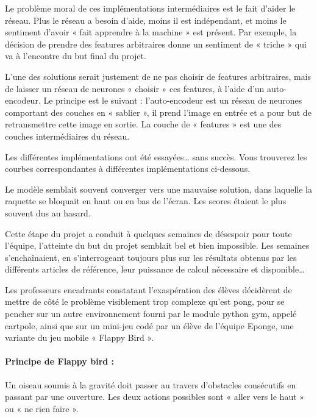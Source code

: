 \documentclass[
    10pt,
    a4paper,
    oneside,
    headinclude,footinclude,
    BCOR=5mm,
    captions=tableabove
]{scrartcl}
\begin{document}
Le problème moral de ces implémentations intermédiaires est le fait d’aider le réseau. Plus le réseau a besoin d’aide, moins il est indépendant, et moins le sentiment d’avoir « fait apprendre à la machine » est présent. Par exemple, la décision de prendre des features arbitraires donne un sentiment de « triche » qui va à l’encontre du but final du projet. 

L’une des solutions serait justement de ne pas choisir de features arbitraires, mais de laisser un réseau de neurones « choisir » ces features, à l’aide d’un auto-encodeur. Le principe est le suivant : l’auto-encodeur est un réseau de neurones comportant des couches en « sablier », il prend l’image en entrée et a pour but de retransmettre cette image en sortie. La couche de « features » est une des couches intermédiaires du réseau. %

Les différentes implémentations ont été essayées… sans succès. Vous trouverez les courbes correspondantes à différentes implémentations ci-dessous.

Le modèle semblait souvent converger vers une mauvaise solution, dans laquelle la raquette se bloquait en haut ou en bas de l'écran. Les scores étaient le plus souvent dus au hasard.


Cette étape du projet a conduit à quelques semaines de désespoir pour toute l’équipe, l’atteinte du but du projet semblait bel et bien impossible. Les semaines s’enchaînaient, en s’interrogeant toujours plus sur les résultats obtenus par les différents articles de référence, leur puissance de calcul nécessaire et disponible…

Les professeurs encadrants constatant l’exaspération des élèves décidèrent de mettre de côté le problème visiblement trop complexe qu’est pong, pour se pencher sur un autre environnement fourni par le module python gym, appelé cartpole, ainsi que sur un mini-jeu codé par un élève de l’équipe Eponge, une variante du jeu mobile « Flappy Bird ».

\paragraph{Principe de Flappy bird :}
Un oiseau soumis à la gravité doit passer au travers d’obstacles consécutifs en passant par une ouverture. Les deux actions possibles sont « aller vers le haut » ou « ne rien faire ».
\end{document}
